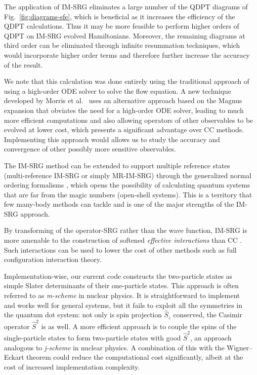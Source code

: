 \documentclass[aip, jcp, 12pt]{revtex4-1}
\begin{document}
The application of IM-SRG eliminates a large number of the QDPT diagrams of Fig.\ \ref{fig:diagrams-sfe}, which is beneficial as it increases the efficiency of the QDPT calculations.  Thus it may be more feasible to perform higher orders of QDPT on IM-SRG evolved Hamiltonians.  Moreover, the remaining diagrams at third order can be eliminated through infinite resummation techniques, which would incorporate higher order terms and therefore further increase the accuracy of the result.

We note that this calculation was done entirely using the traditional approach of using a high-order ODE solver to solve the flow equation.  A new technique developed by Morris et al.\ \cite{PhysRevC.92.034331} uses an alternative approach based on the Magnus expansion that obviates the need for a high-order ODE solver, leading to much more efficient computations and also allowing operators of other observables to be evolved at lower cost, which presents a significant advantage over CC methods.  Implementing this approach would allows us to study the accuracy and convergence of other possibly more sensitive observables.

The IM-SRG method can be extended to support multiple reference states (multi-reference IM-SRG or simply MR-IM-SRG) \cite{PhysRevLett.110.242501,PhysRevC.90.041302} through the generalized normal ordering formalisms \cite{doi:10.1063/1.474405}, which opens the possibility of calculating quantum systems that are far from the magic numbers (open-shell systems).  This is a territory that few many-body methods can tackle and is one of the major strengths of the IM-SRG approach.

By transforming of the operator-SRG rather than the wave function, IM-SRG is more amenable to the construction of softened \textit{effective interactions} than CC \cite{Hergert2016165}.  Such interactions can be used to lower the cost of other methods such as full configuration interaction theory.

Implementation-wise, our current code constructs the two-particle states as simple Slater determinants of their one-particle states.  This approach is often referred to as \textit{m-scheme} in nuclear physics.  It is straightforward to implement and works well for general systems, but it fails to exploit all the symmetries in the quantum dot system: not only is spin projection $\hat S_z$ conserved, the Casimir operator $\hat S^2$ is as well.  A more efficient approach is to couple the spins of the single-particle states to form two-particle states with good $\hat S^2$, an approach analogous to \textit{j-scheme} in nuclear physics.  A combination of this with the Wigner--Eckart theorem could reduce the computational cost significantly, albeit at the cost of increased implementation complexity.
\end{document}
